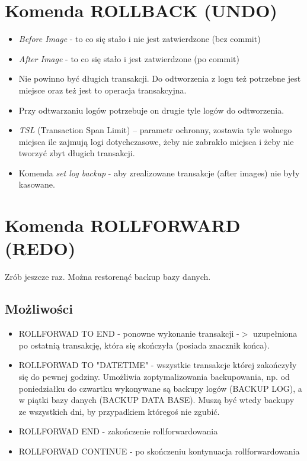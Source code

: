 \documentclass[a4paper,twoside]{article}
\begin{document}
  	\section*{Komenda ROLLBACK (UNDO)}
  	\begin{itemize}
  		\item \emph{Before Image} - to co się stało i nie jest zatwierdzone (bez commit)
  		\item \emph{After Image} - to co się stało i jest zatwierdzone (po commit)
  		\item Nie powinno być długich transakcji. Do odtworzenia z logu też potrzebne jest miejsce oraz też jest to operacja transakcyjna.
  		\item Przy odtwarzaniu logów potrzebuje on drugie tyle logów do odtworzenia.
  		\item \emph{TSL} (Transaction Span Limit) – parametr ochronny, zostawia tyle wolnego miejsca ile zajmują logi dotychczasowe, żeby nie zabrakło miejsca i żeby nie tworzyć zbyt długich transakcji.
  		\item Komenda \textit{set log backup} - aby zrealizowane transakcje (after images) nie były kasowane.
  	\end{itemize}
  	
  	\section*{Komenda ROLLFORWARD (REDO)}
  	Zrób jeszcze raz. Można restorenąć backup bazy danych.
  	\subsection*{Możliwości}
  	\begin{itemize}
  		\item ROLLFORWAD TO END - ponowne wykonanie transakcji -$ > $ uzupełniona po ostatnią transakcję, która się skończyła (posiada znacznik końca).
  		\item ROLLFORWAD TO "DATETIME" - wszystkie transakcje której zakończyły się do pewnej godziny. Umożliwia zoptymalizowania backupowania, np. od poniedziałku do czwartku wykonywane są backupy logów (BACKUP LOG), a w piątki bazy danych (BACKUP DATA BASE). Muszą być wtedy backupy ze wszystkich dni, by przypadkiem któregoś nie zgubić.
  		\item ROLLFORWAD END - zakończenie rollforwardowania
  		\item ROLLFORWAD CONTINUE - po skończeniu kontynuacja rollforwardowania
  	\end{itemize}
  	
\end{document}
